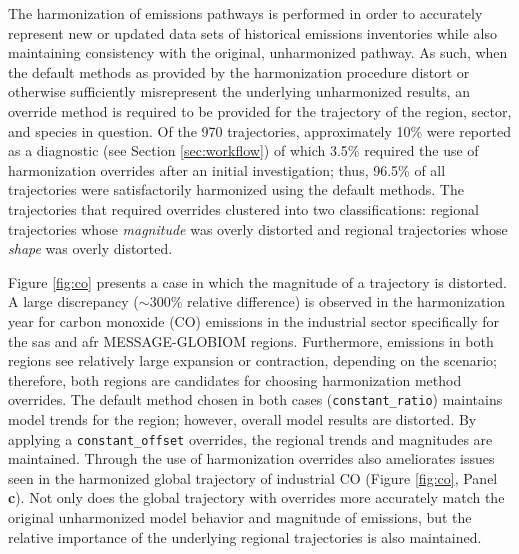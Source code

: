 \documentclass[review]{elsarticle}
\newcommand{\code}[1]{\lstinline[basicstyle=\ttfamily\color{black}]|#1|}
\begin{document}
The harmonization of emissions pathways is performed in order to accurately
represent new or updated data sets of historical emissions inventories while also
maintaining consistency with the original, unharmonized pathway. As such, when
the default methods as provided by the harmonization procedure distort or
otherwise sufficiently misrepresent the underlying unharmonized results, an
override method is required to be provided for the trajectory of the region,
sector, and species in question. Of the 970 trajectories, approximately 10\%
were reported as a diagnostic (see Section \ref{sec:workflow}) of which 3.5\%
required the use of harmonization overrides after an initial investigation;
thus, 96.5\% of all trajectories were satisfactorily harmonized using the
default methods. The trajectories that required overrides clustered into two
classifications: regional trajectories whose \textit{magnitude} was overly
distorted and regional trajectories whose \textit{shape} was overly distorted.

Figure \ref{fig:co} presents a case in which the magnitude of a trajectory is
distorted. A large discrepancy ($\sim$300\% relative difference) is observed in
the harmonization year for carbon monoxide (CO) emissions in the industrial
sector specifically for the \gls{sas} and \gls{afr} MESSAGE-GLOBIOM
regions. Furthermore, emissions in both regions see relatively large expansion
or contraction, depending on the scenario; therefore, both regions are
candidates for choosing harmonization method overrides. The default method
chosen in both cases (\code{constant_ratio}) maintains model trends for the
region; however, overall model results are distorted. By applying a
\code{constant_offset} overrides, the regional trends and magnitudes are
maintained. Through the use of harmonization overrides also ameliorates issues
seen in the harmonized global trajectory of industrial CO (Figure \ref{fig:co},
Panel \textbf{c}). Not only does the global trajectory with overrides more
accurately match the original unharmonized model behavior and magnitude of
emissions, but the relative importance of the underlying regional trajectories
is also maintained.
\end{document}
